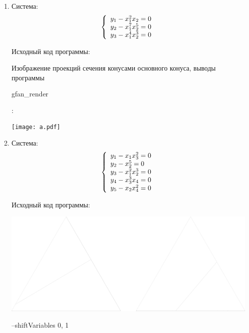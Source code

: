 \begin{enumerate}
  \item Система: 
    \[ \left\{ 
\begin{array}{l l}
  y_1  -  x_{1}^2 x_2 = 0 \\
  y_2  -  x_{1}^7 x_{2}^5 = 0 \\
  y_3  -  x_{1}^4 x_{2}^3 = 0
\end{array} \right.
\]

Исходный код программы:
\lstset{language=python, caption=1.py,%
label=source-code, basicstyle=\footnotesize,%
numbers=left, numberstyle=\footnotesize, numbersep=5pt, frame=single, breaklines=true, breakatwhitespace=false,%
inputencoding=utf8x}


Изображение проекций сечения конусами основного конуса, выводы программы \begin{tt}gfan\_render\end{tt}:

\begin{center}
\texttt{[image: a.pdf]}
\end{center}

\newpage

  \item Система: 
    \[ \left\{ 
\begin{array}{l l}
  y_1  -  x_{1} x_3^2 = 0 \\
  y_2  -  x_{2}^5 = 0 \\
  y_3  -  x_{1}^2 x_{2}^3 = 0 \\
  y_4  -  x_3^3 x_4 = 0 \\
  y_5  -  x_2 x_4^2 = 0 \\
\end{array} \right.
\]

Исходный код программы:
\lstset{language=python, caption=2.py,%
label=source-code, basicstyle=\footnotesize,%
numbers=left, numberstyle=\footnotesize, numbersep=5pt, frame=single, breaklines=true, breakatwhitespace=false,%
inputencoding=utf8x}


\begin{center}
\includegraphics[scale=0.06]{mix4.pdf}
\begin{tt}--shiftVariables 0, 1\end{tt}


\end{center}
\end{enumerate}
